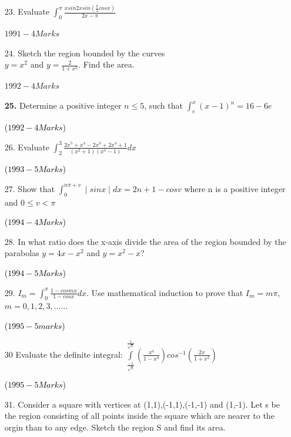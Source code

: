 \documentclass[journal,12pt,twocolumn]{IEEEtran}
\theoremstyle{remark}
\begin{document}
\begin{enumerate}
\item[23.] Evaluate $\int_{0}^{\pi}\frac{xsin2xsin(\frac{\pi}{2}cosx)}{2x-\pi}$

\hfill{$1991-4 Marks$}

\item[24.]  Sketch the region bounded by the curves\\ $y=x^2$ and
$y=\frac{2}{1+x^2}$. Find the area.


\hfill{$1992-4 Marks$}

\textbf{25.} Determine a positive integer $n\leq 5$, such that $\int_e^x(x-1)^n=16-6e$

\hfill{\textcolor{black}{($1992-4 Marks$)}}\\

\item[26.]  Evaluate $\int_{2}^{3}\frac{2x^5+x^4-2x^3+2x^4+1}{(x^2+1)(x^4-1)}dx$

\hfill{\textcolor{black}{($1993 - 5 Marks$)}}

\item[27.]  Show that $\int_{0}^{n\pi+v}\mid sinx \mid dx=2n+1-cosv$ where n is a positive integer and $0 \leq v < \pi$

\hfill{\textcolor{black}{($1994-4 Marks$)}}\\

\item[28.]  In what ratio does the x-axis divide the area of the region bounded by the parabolas $y=4x-x^2$ and $y=x^2-x$?

\hfill{\textcolor{black}{($1994-5 Marks$)}}\\

\item[29.]  $I_m=\int_{0}^{\pi}\frac{1-cosmx}{1-cosx}dx$. Use mathematical induction to prove that $I_m=m\pi$, $m=0,1,2,3,......$

\hfill{\textcolor{black}{($1995-5 marks$)}}\\

\item[30]  Evaluate the definite integral:
$\int\limits_{\frac{-1}{\sqrt{3}}}^{\frac{1}{\sqrt{3}}}(\frac{x^4}{1-x^4})cos^{-1}(\frac{2x}{1+x^2})$

\hfill{\textcolor{black}{($1995-5Marks$)}}\\

\item[31.]  Consider a square with vertices at (1,1),(-1,1),(-1,-1) and (1,-1). Let s be the region consisting of all points inside  the square which are nearer to the orgin than to any edge. Sketch the region S and find its area.


\end{enumerate}
\end{document}
